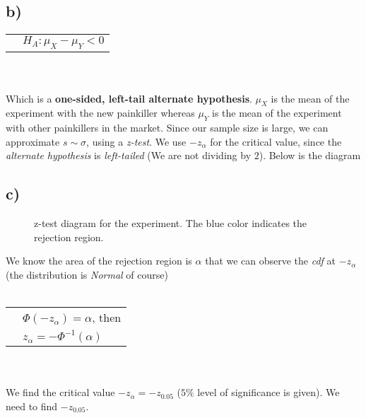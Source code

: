 \documentclass[12pt]{article}
\begin{document}
\subsection*{b)}
\begin{tabular}{l l}
    &$H_A: \mu_X-\mu_Y < 0$\\
\end{tabular}
\\ \\
Which is a 
\textbf{one-sided, left-tail alternate hypothesis}.
$\mu_X$ is the mean of the experiment with the 
new painkiller whereas $\mu_Y$ is the mean 
of the experiment with other 
painkillers in the market.
Since our sample size is large, we can approximate
$s \sim \sigma$, using a \textit{z-test}.
We use $-z_\alpha$ for the critical value, since
the \textit{alternate hypothesis} is \textit{left-tailed}
(We are not dividing by $2$).
Below is the diagram
\subsection*{c)}
\begin{figure}[h]
    \centering
        \captionsetup{labelformat=empty}
        \caption{z-test diagram for the experiment. 
        The blue color indicates the rejection region.}
        \label{z-test}
\end{figure}
We know the area of the rejection region is $\alpha$
that we can observe the \textit{cdf} at $-z_\alpha$
(the distribution is \textit{Normal} of course)
\\ \\
\begin{tabular}{l l}
    & $\Phi(-z_\alpha)=\alpha$, then\\
    & $z_\alpha=-\Phi^{-1}(\alpha)$\\
\end{tabular}
\\ \\
We find the 
critical value $-z_\alpha=-z_{0.05}$ ($5\%$ level of 
significance is given). 
We need to find $-z_{0.05}$.
\end{document}
